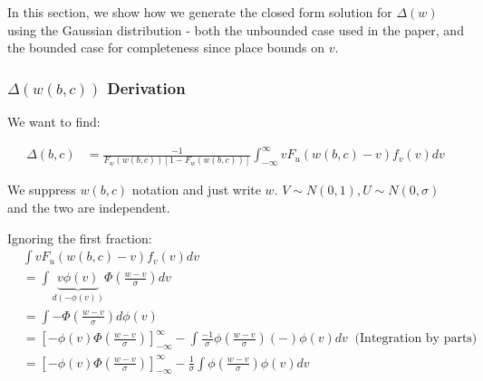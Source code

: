 
In this section, we show how we generate the closed form solution for $\Delta(w)$ using the 
Gaussian distribution - both the unbounded case used in the paper, and the bounded case for completeness since \cite{Benabou_laws_2011} place bounds on $v$.
\subsubsection{$\Delta(w(b,c))$ Derivation}
We want to find:

\begin{align*}
    \Delta(b,c) &= \frac{
        -1
    }{
        F_w(w(b,c)) [1 - F_w(w(b,c))]
    } \int^\infty_{-\infty} vF_u(w(b,c) - v) f_v(v) dv
\end{align*}

We suppress $w(b,c)$ notation and just write $w$. $V \sim N(0, 1), U \sim N(0, \sigma)$ 
and the two are independent.


Ignoring the first fraction:
\begin{align*}
    &\int vF_u(w(b,c) - v) f_v(v) dv \\
    &= 
    \int \underbrace{v \phi(v)}_{d(-\phi(v))} \Phi\left(\frac{w-v}{\sigma}\right) dv \\
    &= \int - \Phi\left(\frac{w-v}{\sigma}\right) d \phi(v) \\
    &= \left[
        -\phi(v) \Phi\left(\frac{w-v}{\sigma}\right) 
    \right]^\infty_{-\infty} - \int \frac{-1}{\sigma}\phi\left(\frac{w - v}{\sigma}\right) (-) \phi(v) dv \ \text{ (Integration by parts)} \\ 
    &= \left[
        -\phi(v) \Phi\left(\frac{w-v}{\sigma}\right) 
    \right]^\infty_{-\infty} -\frac{1}{\sigma} \int \phi\left(\frac{w - v}{\sigma}\right) \phi(v) dv 
\end{align*}



